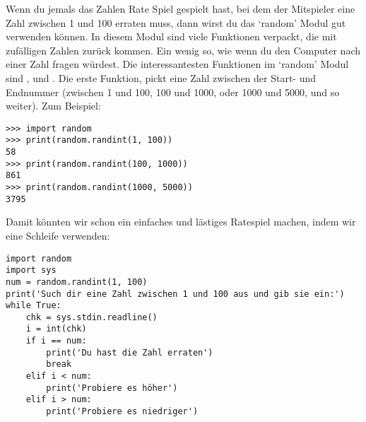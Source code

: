 Wenn du jemals das Zahlen Rate Spiel gespielt hast, bei dem der Mitspieler eine Zahl zwischen 1 und 100 erraten muss, dann wirst du das `random' Modul gut verwenden können. In diesem Modul sind viele Funktionen verpackt, die mit zufälligen Zahlen zurück kommen. Ein wenig so, wie wenn du den Computer nach einer Zahl fragen würdest. Die interessantesten Funktionen im `random' Modul sind ,  und . Die erste Funktion,  pickt eine Zahl zwischen der Start- und Endnummer (zwischen 1 und 100, 100 und 1000, oder 1000 und 5000, und so weiter). Zum Beispiel:

\begin{Verbatim}[frame=single]
>>> import random
>>> print(random.randint(1, 100))
58
>>> print(random.randint(100, 1000))
861
>>> print(random.randint(1000, 5000))
3795
\end{Verbatim}

Damit könnten wir schon ein einfaches und lästiges Ratespiel machen, indem wir eine Schleife verwenden:

\begin{Verbatim}[frame=single]
import random
import sys
num = random.randint(1, 100)
print('Such dir eine Zahl zwischen 1 und 100 aus und gib sie ein:')
while True:
    chk = sys.stdin.readline()
    i = int(chk)
    if i == num:
        print('Du hast die Zahl erraten')
        break
    elif i < num:
        print('Probiere es höher')
    elif i > num:
        print('Probiere es niedriger')
\end{Verbatim}


